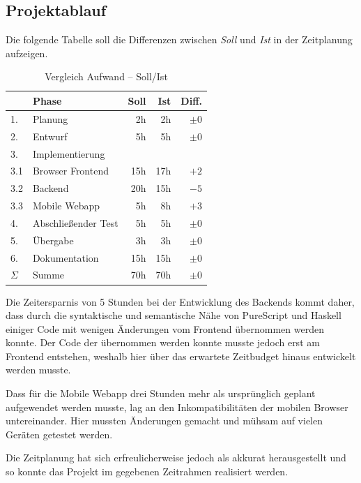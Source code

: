 \subsection{Projektablauf}
Die folgende Tabelle soll die Differenzen zwischen \textit{Soll} und \textit{Ist} in
der Zeitplanung aufzeigen.
\begin{table}[htb]
\centering
\begin{tabular}{l l r r r}
\toprule
   & Phase                & Soll & Ist & Diff. \\
\midrule
1. & Planung              & 2h  &  2h & $\pm0$ \\
2. & Entwurf              & 5h  &  5h & $\pm0$ \\
\midrule
3.  & Implementierung     &     &     &        \\
3.1 & Browser Frontend    & 15h & 17h & $  +2$ \\
3.2 & Backend             & 20h & 15h & $  -5$ \\
3.3 & Mobile Webapp       & 5h  &  8h & $  +3$ \\
\midrule
4. & Abschließender Test  &  5h &  5h & $\pm0$ \\
5. & Übergabe             &  3h &  3h & $\pm0$ \\
6. & Dokumentation        & 15h & 15h & $\pm0$ \\
\cmidrule{3-5}
$\Sigma$ & Summe          & 70h & 70h & $\pm0$ \\
\bottomrule
\end{tabular}
\caption{Vergleich Aufwand -- Soll/Ist}
\end{table}

\noindent Die Zeitersparnis von 5 Stunden bei der Entwicklung des
Backends kommt daher, dass durch die syntaktische und semantische Nähe
von PureScript und Haskell einiger Code mit wenigen Änderungen vom
Frontend übernommen werden konnte. Der Code der übernommen werden
konnte musste jedoch erst am Frontend entstehen, weshalb hier über das
erwartete Zeitbudget hinaus entwickelt werden musste.

\noindent Dass für die Mobile Webapp drei Stunden mehr als ursprünglich
geplant aufgewendet werden musste, lag an den Inkompatibilitäten der
mobilen Browser untereinander. Hier mussten Änderungen gemacht und
mühsam auf vielen Geräten getestet werden.

\noindent  Die Zeitplanung hat sich erfreulicherweise jedoch als akkurat
herausgestellt und so konnte das Projekt im gegebenen Zeitrahmen
realisiert werden.

